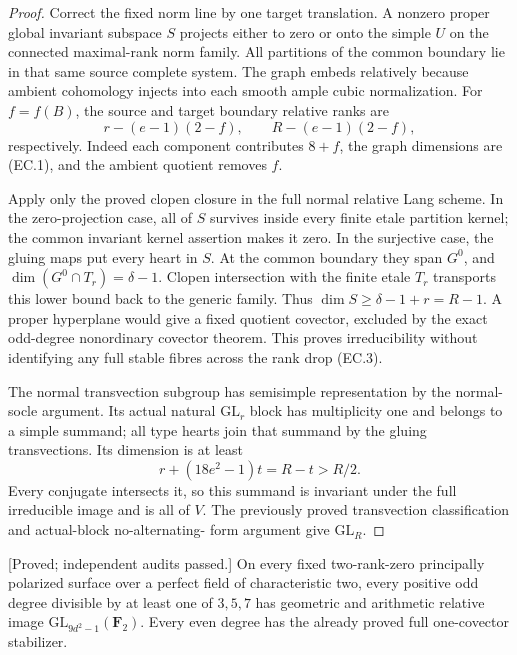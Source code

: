 \begin{proof}
Correct the fixed norm line by one target translation. A nonzero
proper global invariant subspace $S$ projects either to zero or
onto the simple $U$ on the connected maximal-rank norm family.
All partitions of the common boundary lie in that same source
complete system. The graph embeds relatively because ambient
cohomology injects into each smooth ample cubic normalization.
For $f=f(B)$, the source and target boundary relative ranks are
\[
 r-(e-1)(2-f),\qquad R-(e-1)(2-f),                              \tag{EC.3}
\]
respectively. Indeed each component contributes $8+f$, the graph
dimensions are (EC.1), and the ambient quotient removes $f$.

Apply only the proved clopen closure in the full normal relative
Lang scheme. In the zero-projection case, all of $S$ survives
inside every finite etale partition kernel; the common invariant
kernel assertion makes it zero. In the surjective case, the
gluing maps put every heart in $S$. At the common boundary they
span $G^0$, and $\dim(G^0\cap T_r)=\delta-1$.
Clopen intersection with the finite etale $T_r$ transports this
lower bound back to the generic family. Thus
$\dim S\ge\delta-1+r=R-1$. A proper hyperplane would give a
fixed quotient covector, excluded by the exact odd-degree
nonordinary covector theorem. This proves irreducibility without
identifying any full stable fibres across the rank drop (EC.3).

The normal transvection subgroup has semisimple representation
by the normal-socle argument. Its actual natural $\mathrm{GL}_r$
block has multiplicity one and belongs to a simple summand; all
type hearts join that summand by the gluing transvections.
Its dimension is at least
\[
                r+(18e^2-1)t=R-t>R/2.
\]
Every conjugate intersects it, so this summand is invariant under
the full irreducible image and is all of $V$. The previously
proved transvection classification and actual-block no-alternating-
form argument give $\mathrm{GL}_R$.
\end{proof}

\begin{corollary}
\label{cor:f0-odd-multiples-three-five-seven-candidate}
\textup{[Proved; independent audits passed.]}
On every fixed two-rank-zero principally polarized surface over
a perfect field of characteristic two, every positive odd degree
divisible by at least one of $3,5,7$ has geometric and arithmetic
relative image $\mathrm{GL}_{9d^2-1}(\mathbf F_2)$. Every even
degree has the already proved full one-covector stabilizer.
\end{corollary}

